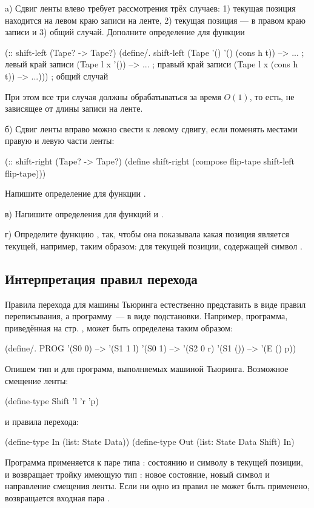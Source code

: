 \begin{Assignment}
a) Сдвиг ленты влево требует рассмотрения трёх случаев: 1) текущая позиция находится на левом краю записи на ленте, 2) текущая позиция --- в правом краю записи и 3) общий случай.
 Дополните определение для функции 
\begin{Definition}
(:: shift-left (Tape? -> Tape?)
  (define/. shift-left
    (Tape '() '() (cons h t)) --> ...   ; левый край записи
    (Tape  l x '())           --> ...   ; правый край записи
    (Tape  l x (cons h t))    --> ...))) ; общий случай
\end{Definition}
\noindent

При этом все три случая должны обрабатываться за время $O(1)$, то  есть, не зависящее от длины записи на ленте.

б) Сдвиг ленты вправо можно свести к левому сдвигу, если поменять местами правую и левую части ленты:
\begin{Definition}
(:: shift-right (Tape? -> Tape?)
  (define shift-right
    (compose flip-tape shift-left flip-tape)))
\end{Definition}
Напишите определение для функции .

\newpage
в) Напишите определения для функций  и .

г) Определите функцию , так, чтобы она показывала какая позиция является текущей, например, таким образом:  для текущей позиции, содержащей символ .
\end{Assignment}

\subsection*{Интерпретация правил перехода}

Правила перехода для машины Тьюринга естественно представить в виде правил переписывания, а программу~--- в виде подстановки. Например, программа, приведённая на стр. \pageref{TM-prog}, может быть определена таким образом:
\begin{SchemeCode}
(define/. PROG
  '(S0 0) --> '(S1 1 l)
  '(S0 1) --> '(S2 0 r)
  '(S1 ()) --> '(E () p))
\end{SchemeCode}

Опишем тип и для программ, выполняемых машиной Тьюринга. Возможное смещение ленты:
\begin{SchemeCode}
(define-type Shift 'l 'r 'p)
\end{SchemeCode}
\noindent и правила перехода:
\begin{SchemeCode}
(define-type In (list: State Data))
(define-type Out (list: State Data Shift) 
                 In)
\end{SchemeCode}
Программа применяется к паре типа : состоянию и символу в текущей позиции, и возвращает тройку имеющую тип : новое состояние, новый символ и направление смещения ленты. Если ни одно из правил не может быть применено, возвращается входная пара .

